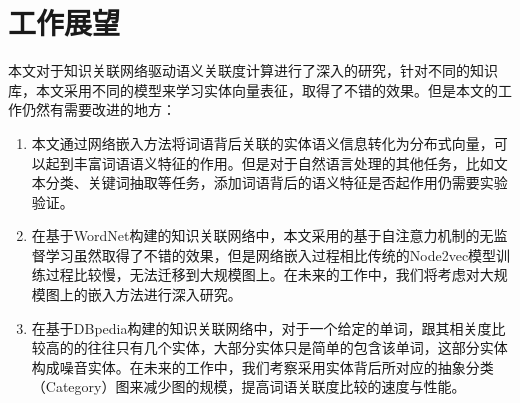 \section{工作展望}
本文对于知识关联网络驱动语义关联度计算进行了深入的研究，针对不同的知识库，本文采用不同的模型来学习实体向量表征，取得了不错的效果。但是本文的工作仍然有需要改进的地方：
\begin{enumerate}
    \item 本文通过网络嵌入方法将词语背后关联的实体语义信息转化为分布式向量，可以起到丰富词语语义特征的作用。但是对于自然语言处理的其他任务，比如文本分类、关键词抽取等任务，添加词语背后的语义特征是否起作用仍需要实验验证。
    \item 在基于WordNet构建的知识关联网络中，本文采用的基于自注意力机制的无监督学习虽然取得了不错的效果，但是网络嵌入过程相比传统的Node2vec模型训练过程比较慢，无法迁移到大规模图上。在未来的工作中，我们将考虑对大规模图上的嵌入方法进行深入研究。
    \item 在基于DBpedia构建的知识关联网络中，对于一个给定的单词，跟其相关度比较高的的往往只有几个实体，大部分实体只是简单的包含该单词，这部分实体构成噪音实体。在未来的工作中，我们考察采用实体背后所对应的抽象分类（Category）图来减少图的规模，提高词语关联度比较的速度与性能。
\end{enumerate}